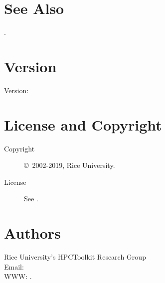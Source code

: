 \documentclass[english]{article}
\begin{document}


\section{See Also}

.

\section{Version}

Version: \Version

\section{License and Copyright}

\begin{description}
\item[Copyright] \copyright\ 2002-2019, Rice University.
\item[License] See .
\end{description}

\section{Authors}

\noindent
Rice University's HPCToolkit Research Group \\
Email:  \\
WWW: .

\LatexManEnd
\end{document}
